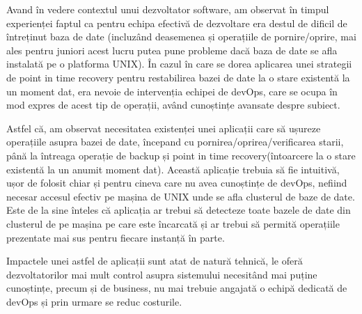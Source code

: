\large
Avand în vedere contextul unui dezvoltator software, am observat în timpul experienței faptul ca pentru echipa efectivă de dezvoltare era destul de dificil de întreținut baza de date (incluzând deasemenea și operațiile de pornire/oprire, mai ales pentru juniori acest lucru putea pune probleme dacă baza de date se afla instalată pe o platforma UNIX). În cazul în care se dorea aplicarea unei strategii de point in time recovery pentru restabilirea bazei de date la o stare existentă la un moment dat, era nevoie de intervenția echipei de devOps, care se ocupa în mod expres de acest tip de operații, având cunoștințe avansate despre subiect.
\par
Astfel că, am observat necesitatea existenței unei aplicații care să ușureze operațiile asupra bazei de date, începand cu pornirea/oprirea/verificarea starii, până la întreaga operație de backup și point in time recovery(întoarcere la o stare existentă la un anumit moment dat). Această aplicație trebuia să fie intuitivă, ușor de folosit chiar și pentru cineva care nu avea cunoștințe de devOps, nefiind necesar accesul efectiv pe mașina de UNIX unde se afla clusterul de baze de date. Este de la sine înteles că aplicația ar trebui să detecteze toate bazele de date din clusterul de pe mașina pe care este încarcată și ar trebui să permită operațiile prezentate mai sus pentru fiecare instanță în parte.
\par
Impactele unei astfel de aplicații sunt atat de natură tehnică, le oferă dezvoltatorilor mai mult control asupra sistemului necesitând mai puține cunoștințe, precum și de business, nu mai trebuie angajată o echipă dedicată de devOps și prin urmare se reduc costurile.